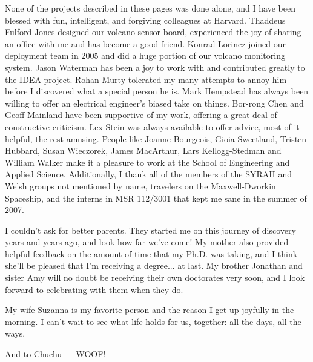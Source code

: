 None of the projects described in these pages was done alone, and I have been
blessed with fun, intelligent, and forgiving colleagues at Harvard. Thaddeus
Fulford-Jones designed our volcano sensor board, experienced the joy of
sharing an office with me and has become a good friend. Konrad Lorincz joined
our deployment team in 2005 and did a huge portion of our volcano monitoring
system. Jason Waterman has been a joy to work with and contributed greatly to
the IDEA project. Rohan Murty tolerated my many attempts to annoy him before
I discovered what a special person he is. Mark Hempstead has always been
willing to offer an electrical engineer's biased take on things. Bor-rong
Chen and Geoff Mainland have been supportive of my work, offering a great
deal of constructive criticism. Lex Stein was always available to offer
advice, most of it helpful, the rest amusing. People like Joanne Bourgeois,
Gioia Sweetland, Tristen Hubbard, Susan Wieczorek, James MacArthur, Lars
Kellogg-Stedman and William Walker make it a pleasure to work at the School
of Engineering and Applied Science. Additionally, I thank all of the members
of the SYRAH and Welsh groups not mentioned by name, travelers on the
Maxwell-Dworkin Spaceship, and the interns in MSR 112/3001 that kept me sane
in the summer of 2007.

\clearpage

I couldn't ask for better parents. They started me on this journey of
discovery years and years ago, and look how far we've come! My mother also
provided helpful feedback on the amount of time that my Ph.D. was taking, and
I think she'll be pleased that I'm receiving a degree... at last. My brother
Jonathan and sister Amy will no doubt be receiving their own doctorates very
soon, and I look forward to celebrating with them when they do.

My wife Suzanna is my favorite person and the reason I get up joyfully in the
morning. I can't wait to see what life holds for us, together: all the days,
all the ways.

And to Chuchu --- WOOF!
